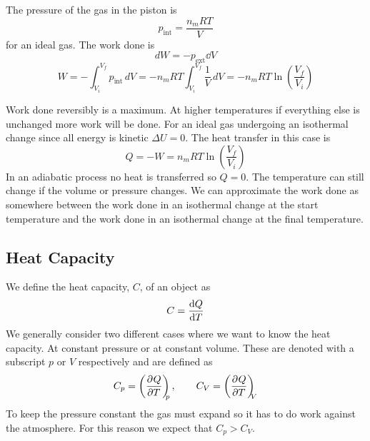 \documentclass{article}
\begin{document}
    The pressure of the gas in the piston is
    \[p_\text{int} = \frac{n_mRT}{V}\]
    for an ideal gas.
    The work done is
    \[dW = -p_\text{ext}\dd V\]
    \[W = -\int_{V_i}^{V_f}p_\text{int}\,dV = -n_mRT\int_{V_i}^{V_f}\frac{1}{V}\,dV = -n_mRT\ln\left(\frac{V_f}{V_i}\right)\]
    
    Work done reversibly is a maximum.
    At higher temperatures if everything else is unchanged more work will be done.
    For an ideal gas undergoing an isothermal change since all energy is kinetic \(\Delta U = 0\).
    The heat transfer in this case is
    \[Q = -W = n_mRT\ln\left(\frac{V_f}{V_i}\right)\]
    In an adiabatic process no heat is transferred so \(Q = 0\).
    The temperature can still change if the volume or pressure changes.
    We can approximate the work done as somewhere between the work done in an isothermal change at the start temperature and the work done in an isothermal change at the final temperature.
    
    \subsection{Heat Capacity}
    We define the heat capacity, \(C\), of an object as
    \[C = \dv{Q}{T}\]
    We generally consider two different cases where we want to know the heat capacity.
    At constant pressure or at constant volume.
    These are denoted with a subscript \(p\) or \(V\) respectively and are defined as
    \[C_p = \left(\pdv[]{Q}{T}\right)_{\!\!\!{p}},\qquad C_V = \left(\pdv[]{Q}{T}\right)_{\!\!\!{V}}\]
    To keep the pressure constant the gas must expand so it has to do work against the atmosphere.
    For this reason we expect that \(C_p > C_V\).
    
\end{document}
